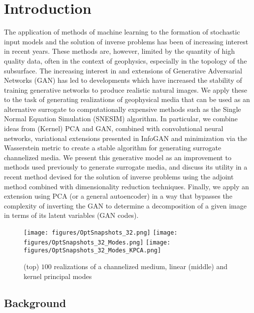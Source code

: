 \documentclass{article}
\begin{document}
\section{Introduction}
The application of methods of machine learning to the formation of stochastic input models and the solution of inverse problems has been of increasing interest in recent years.  These methods are, however, limited by the quantity of high quality data, often in the context of geophysics, especially in the topology of the subsurface.  The increasing interest in and extensions of Generative Adversarial Networks (GAN) has led to developments which have increased the stability of training generative networks to produce realistic natural images.  We apply these to the task of generating realizations of geophysical media that can be used as an alternative surrogate to computationally expensive methods such as the Single Normal Equation Simulation (SNESIM) algorithm.  In particular, we combine ideas from (Kernel) PCA and GAN, combined with  convolutional neural networks, variational extensions presented in InfoGAN and minimization via the Wasserstein metric to create a stable algorithm for generating surrogate channelized media.  We present this generative model as an improvement to methods used previously to generate surrogate media, and discuss its utility in a recent method devised for the solution of inverse problems using the adjoint method combined with dimensionality reduction techniques.  Finally, we apply an extension using PCA (or a general autoencoder) in a way that bypasses the complexity of inverting the GAN to determine a decomposition of a given image in terms of its latent variables (GAN codes).

\begin{figure}[h]
\centering
  \texttt{[image: figures/OptSnapshots\_32.png]}
  \texttt{[image: figures/OptSnapshots\_32\_Modes.png]}
  \texttt{[image: figures/OptSnapshots\_32\_Modes\_KPCA.png]}
  \caption{(top) $100$ realizations of a channelized medium, linear (middle) and kernel principal modes }
\end{figure}\label{Snapshots}

\subsection{Background}
\end{document}
